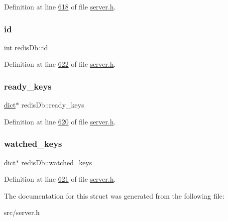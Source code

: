 Definition at line \hyperlink{server_8h_source_l00618}{618} of file \hyperlink{server_8h_source}{server.\+h}.

\mbox{\label{structredisDb_a0c85effb7de0bae1dd2df7c28b4184cd}} 
\subsubsection{\texorpdfstring{id}{id}}
{\footnotesize\ttfamily int redis\+Db\+::id}



Definition at line \hyperlink{server_8h_source_l00622}{622} of file \hyperlink{server_8h_source}{server.\+h}.

\mbox{\label{structredisDb_afdf1927ac43c1249fce9e42ef5c00f83}} 
\subsubsection{\texorpdfstring{ready\+\_\+keys}{ready\_keys}}
{\footnotesize\ttfamily \hyperlink{structdict}{dict}$\ast$ redis\+Db\+::ready\+\_\+keys}



Definition at line \hyperlink{server_8h_source_l00620}{620} of file \hyperlink{server_8h_source}{server.\+h}.

\mbox{\label{structredisDb_a576dec372ec0191a1242557823be6326}} 
\subsubsection{\texorpdfstring{watched\+\_\+keys}{watched\_keys}}
{\footnotesize\ttfamily \hyperlink{structdict}{dict}$\ast$ redis\+Db\+::watched\+\_\+keys}



Definition at line \hyperlink{server_8h_source_l00621}{621} of file \hyperlink{server_8h_source}{server.\+h}.



The documentation for this struct was generated from the following file\+:\begin{DoxyCompactItemize}
\item 
src/server.\+h\end{DoxyCompactItemize}
